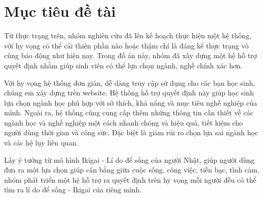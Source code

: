\section{Mục tiêu đề tài}
    Từ thực trạng trên, nhóm nghiên cứu đã lên kế hoạch thực hiện một hệ thống, với hy vọng có thể cải thiện phần nào hoặc thậm chí là đáng kể thực trạng vô cùng báo động như hiện nay. Trong đồ án này, nhóm đã xây dựng một hệ hỗ trợ quyết định nhằm giúp sinh viên có thể lựa chọn ngành, nghề chính xác hơn.
    
    Với hy vọng hệ thống đơn giản, dễ dàng truy cập sử dụng cho các bạn học sinh, chúng em xây dựng trên website. Hệ thống hỗ trợ quyết định này giúp học sinh lựa chọn ngành học phù hợp với sở thích, khả năng và mục tiêu nghề nghiệp của mình. Ngoài ra, hệ thống cũng cung cấp thêm những thông tin cần thiết về các ngành học và nghề nghiệp một cách nhanh chóng và hiệu quả, tiết kiệm cho người dùng thời gian và công sức. Đặc biệt là giảm rủi ro chọn lựa sai ngành học và các hệ lụy liên quan.
    
    Lấy ý tưởng từ mô hình Ikigai - Lí do để sống của người Nhật, giúp người dùng đưa ra một lựa chọn giúp cân bằng giữa cuộc sống, công việc, tiền bạc, tình cảm, nhóm phát triển một hệ hỗ trợ ra quyết định trên hy vọng mỗi người đều có thể tìm ra lí do để sống - Ikigai của riêng mình.
